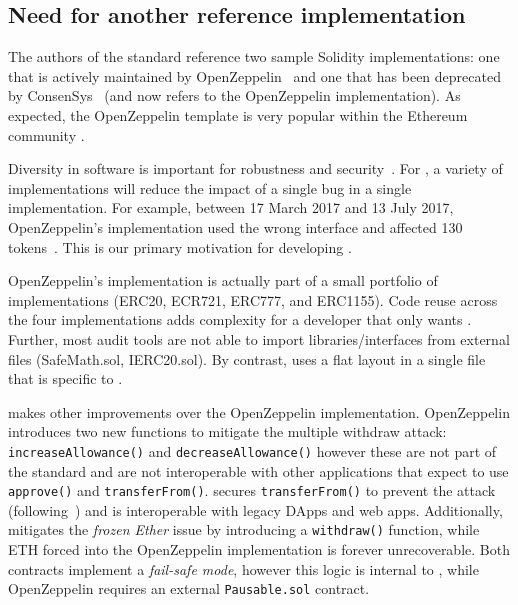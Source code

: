 
\subsection{Need for another reference implementation}

The authors of the \erc standard reference two sample Solidity implementations: one that is actively maintained by OpenZeppelin~\cite{OpenZepplin} and one that has been deprecated by ConsenSys~\cite{ConsensysToken} (and now refers to the OpenZeppelin implementation). As expected, the OpenZeppelin template is very popular within the Ethereum community \cite{OPZ1,OPZ2,OPZ3}.

Diversity in software is important for robustness and security~\cite{FSA97,FHS97}. For \erc, a variety of implementations will reduce the impact of a single bug in a single implementation. For example, between 17 March 2017 and 13 July 2017, OpenZeppelin's implementation used the wrong interface and affected 130 tokens~\cite{ErcBug}. This is our primary motivation for developing \sys.

OpenZeppelin's implementation is actually part of a small portfolio of implementations (ERC20, ECR721, ERC777, and ERC1155). Code reuse across the four implementations adds complexity for a developer that only wants \erc. Further, most audit tools are not able to import libraries/interfaces from external files (\eg SafeMath.sol, IERC20.sol). By contrast, \sys uses a flat layout in a single file that is specific to \erc.

\sys makes other improvements over the OpenZeppelin implementation. OpenZeppelin introduces two new functions to mitigate the multiple withdraw attack: \texttt{increaseAllowance()} and \texttt{decreaseAllowance()} however these are not part of the \erc standard and are not  interoperable with other applications that expect to use \texttt{approve()} and \texttt{transferFrom()}. \sys secures \texttt{transferFrom()} to prevent the attack (following~\cite{ERC20MWA}) and is interoperable with legacy DApps and web apps. Additionally, \sys mitigates the \textit{frozen Ether} issue by introducing a \texttt{withdraw()} function, while ETH forced into the OpenZeppelin implementation is forever unrecoverable. Both contracts implement a \textit{fail-safe mode}, however this logic is internal to \sys, while OpenZeppelin requires an external \texttt{Pausable.sol} contract.


